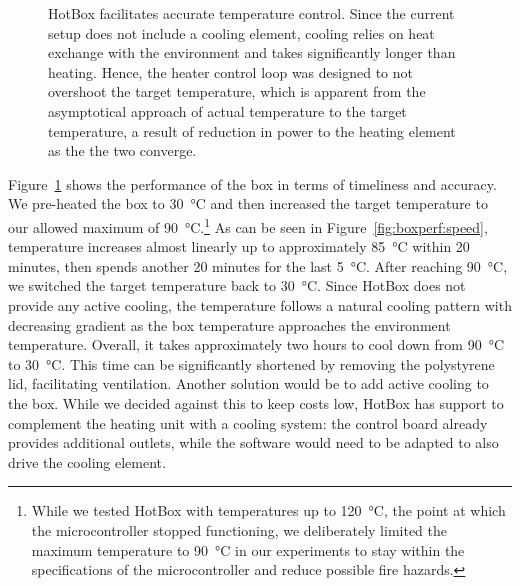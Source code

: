 \documentclass[color]{aib}
\begin{document}
\begin{figure}[t]
\centering
{}
\hfill
{}
\vspace{-6pt}
\caption{HotBox facilitates accurate temperature control. Since the current setup does not include a cooling element, cooling relies on heat exchange with the environment and takes significantly longer than heating. Hence, the heater control loop was designed to not overshoot the target temperature, which is apparent from the asymptotical approach of actual temperature to the target temperature, a result of reduction in power to the heating element as the the two converge.}
\label{fig:boxperf}
\end{figure}

Figure~\ref{fig:boxperf} shows the performance of the box in terms of timeliness and accuracy.
We pre-heated the box to \SI{30}{\celsius} and then increased the target temperature to our allowed maximum of \SI{90}{\celsius}.\footnote{While we tested HotBox with temperatures up to \SI{120}{\celsius}, the point at which the microcontroller stopped functioning, we deliberately limited the maximum temperature to \SI{90}{\celsius} in our experiments to stay within the specifications of the microcontroller and reduce possible fire hazards.}
As can be seen in Figure~\ref{fig:boxperf:speed}, temperature increases almost linearly up to approximately \SI{85}{\celsius} within 20 minutes, then spends another 20 minutes for the last \SI{5}{\celsius}.
After reaching \SI{90}{\celsius}, we switched the target temperature back to \SI{30}{\celsius}.
Since HotBox does not provide any active cooling, the temperature follows a natural cooling pattern with decreasing gradient as the box temperature approaches the environment temperature.
Overall, it takes approximately two hours to cool down from \SI{90}{\celsius} to \SI{30}{\celsius}.
This time can be significantly shortened by removing the polystyrene lid, facilitating ventilation.
Another solution would be to add active cooling to the box.
While we decided against this to keep costs low, HotBox has support to complement the heating unit with a cooling system: the control board already provides additional outlets, while the software would need to be adapted to also drive the cooling element.
\end{document}
